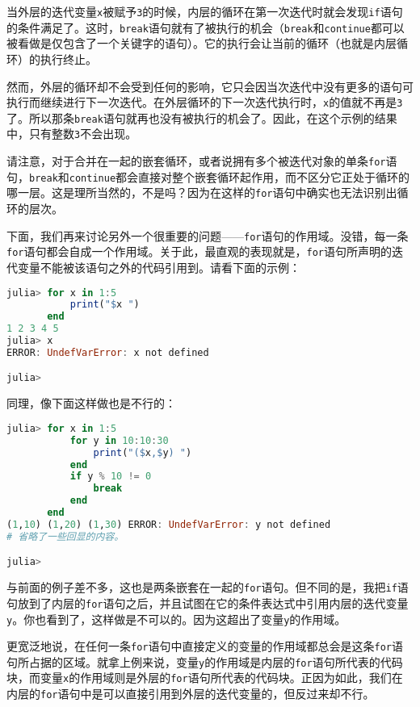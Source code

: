 当外层的迭代变量\verb|x|被赋予\verb|3|的时候，内层的循环在第一次迭代时就会发现\verb|if|语句的条件满足了。这时，\verb|break|语句就有了被执行的机会（\verb|break|和\verb|continue|都可以被看做是仅包含了一个关键字的语句）。它的执行会让当前的循环（也就是内层循环）的执行终止。

然而，外层的循环却不会受到任何的影响，它只会因当次迭代中没有更多的语句可执行而继续进行下一次迭代。在外层循环的下一次迭代执行时，\verb|x|的值就不再是\verb|3|了。所以那条\verb|break|语句就再也没有被执行的机会了。因此，在这个示例的结果中，只有整数\verb|3|不会出现。

请注意，对于合并在一起的嵌套循环，或者说拥有多个被迭代对象的单条\verb|for|语句，\verb|break|和\verb|continue|都会直接对整个嵌套循环起作用，而不区分它正处于循环的哪一层。这是理所当然的，不是吗？因为在这样的\verb|for|语句中确实也无法识别出循环的层次。

下面，我们再来讨论另外一个很重要的问题——\verb|for|语句的作用域。没错，每一条\verb|for|语句都会自成一个作用域。关于此，最直观的表现就是，\verb|for|语句所声明的迭代变量不能被该语句之外的代码引用到。请看下面的示例：
\begin{lstlisting}[language=julia]
julia> for x in 1:5
           print("$x ")
       end
1 2 3 4 5 
julia> x
ERROR: UndefVarError: x not defined

julia> 
\end{lstlisting}

同理，像下面这样做也是不行的：
\begin{lstlisting}[language=julia]
julia> for x in 1:5
           for y in 10:10:30
               print("($x,$y) ")
           end
           if y % 10 != 0 
               break
           end
       end
(1,10) (1,20) (1,30) ERROR: UndefVarError: y not defined
# 省略了一些回显的内容。

julia> 
\end{lstlisting}

与前面的例子差不多，这也是两条嵌套在一起的\verb|for|语句。但不同的是，我把\verb|if|语句放到了内层的\verb|for|语句之后，并且试图在它的条件表达式中引用内层的迭代变量\verb|y|。你也看到了，这样做是不可以的。因为这超出了变量\verb|y|的作用域。

更宽泛地说，在任何一条\verb|for|语句中直接定义的变量的作用域都总会是这条\verb|for|语句所占据的区域。就拿上例来说，变量\verb|y|的作用域是内层的\verb|for|语句所代表的代码块，而变量\verb|x|的作用域则是外层的\verb|for|语句所代表的代码块。正因为如此，我们在内层的\verb|for|语句中是可以直接引用到外层的迭代变量的，但反过来却不行。

